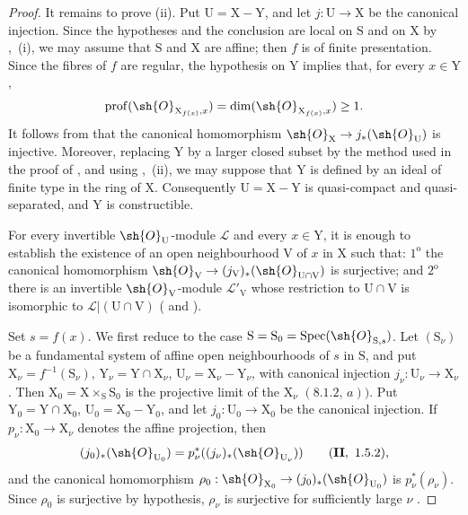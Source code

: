 \begin{proof}
It remains to prove (ii). Put $\mathrm{U}=\mathrm{X}-\mathrm{Y}$, and let $j:\mathrm{U}\to\mathrm{X}$ be the canonical injection. Since the hypotheses and the conclusion are local on $\mathrm{S}$ and on $\mathrm{X}$ by ,~(i), we may assume that $\mathrm{S}$ and $\mathrm{X}$ are affine; then $f$ is of finite presentation. Since the fibres of $f$ are regular, the hypothesis on $\mathrm{Y}$ implies that, for every $x\in\mathrm{Y}$,
\[
  \operatorname{prof}(\sh{O}_{\mathrm{X}_{f(x)},x})
  =\dim(\sh{O}_{\mathrm{X}_{f(x)},x})\geq1.
\]
It follows from  that the canonical homomorphism $\sh{O}_{\mathrm{X}}\to j_*(\sh{O}_{\mathrm{U}})$ is injective. Moreover, replacing $\mathrm{Y}$ by a larger closed subset by the method used in the proof of , and using ,~(ii), we may suppose that $\mathrm{Y}$ is defined by an ideal of finite type in the ring of $\mathrm{X}$. Consequently $\mathrm{U}=\mathrm{X}-\mathrm{Y}$ is quasi-compact and quasi-separated, and $\mathrm{Y}$ is constructible.

For every invertible $\sh{O}_{\mathrm{U}}$-module $\mathscr{L}$ and every $x\in\mathrm{Y}$, it is enough to establish the existence of an open neighbourhood $\mathrm{V}$ of $x$ in $\mathrm{X}$ such that: $1^{\mathrm{o}}$ the canonical homomorphism $\sh{O}_{\mathrm{V}}\to(j_{\mathrm{V}})_*(\sh{O}_{\mathrm{U}\cap\mathrm{V}})$ is surjective; and $2^{\mathrm{o}}$ there is an invertible $\sh{O}_{\mathrm{V}}$-module $\mathscr{L}'_{\mathrm{V}}$ whose restriction to $\mathrm{U}\cap\mathrm{V}$ is isomorphic to $\mathscr{L}|(\mathrm{U}\cap\mathrm{V})$ ( and ).

Set $s=f(x)$. We first reduce to the case $\mathrm{S}=\mathrm{S}_0=\operatorname{Spec}(\sh{O}_{\mathrm{S},s})$. Let $(\mathrm{S}_\nu)$ be a fundamental system of affine open neighbourhoods of $s$ in $\mathrm{S}$, and put $\mathrm{X}_\nu=f^{-1}(\mathrm{S}_\nu)$, $\mathrm{Y}_\nu=\mathrm{Y}\cap\mathrm{X}_\nu$, $\mathrm{U}_\nu=\mathrm{X}_\nu-\mathrm{Y}_\nu$, with canonical injection $j_\nu:\mathrm{U}_\nu\to\mathrm{X}_\nu$. Then $\mathrm{X}_0=\mathrm{X}\times_{\mathrm{S}}\mathrm{S}_0$ is the projective limit of the $\mathrm{X}_\nu$ $(\mathbf{8.1.2},\,a))$. Put $\mathrm{Y}_0=\mathrm{Y}\cap\mathrm{X}_0$, $\mathrm{U}_0=\mathrm{X}_0-\mathrm{Y}_0$, and let $j_0:\mathrm{U}_0\to\mathrm{X}_0$ be the canonical injection. If $p_\nu:\mathrm{X}_0\to\mathrm{X}_\nu$ denotes the affine projection, then
\[
  (j_0)_*(\sh{O}_{\mathrm{U}_0})
  =p_\nu^*((j_\nu)_*(\sh{O}_{\mathrm{U}_\nu}))
  \qquad (\mathbf{II},\ 1.5.2),
\]
and the canonical homomorphism $\rho_0:\sh{O}_{\mathrm{X}_0}\to(j_0)_*(\sh{O}_{\mathrm{U}_0})$ is $p_\nu^*(\rho_\nu)$. Since $\rho_0$ is surjective by hypothesis, $\rho_\nu$ is surjective for sufficiently large $\nu$ .


\end{proof}
